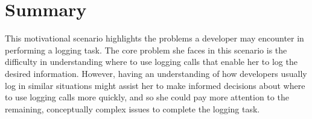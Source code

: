 

\section{Summary}  \label{ch2-summary}

This motivational scenario highlights the problems a developer may encounter in performing a logging task.
The core problem she faces in this scenario is the difficulty in understanding where to use logging calls that enable her to log the desired information. However, having an understanding of how developers usually log in similar situations might assist her to make informed decisions about where to use logging calls more quickly, and so she could pay more attention to the remaining, conceptually complex issues to complete the logging task.




